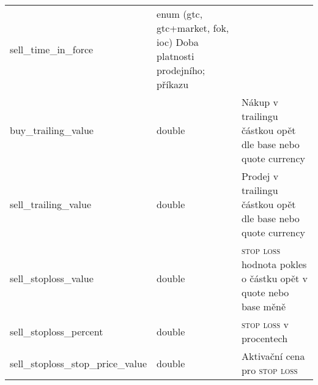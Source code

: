 \begin{center}
\begin{longtable}[t]{|l|C{4cm}|p{4cm}|}
        sell\_time\_in\_force                & enum (gtc, gtc+market, fok, ioc)                                                                                                                                                  Doba platnosti prodejního; příkazu                                                                                                                                     \\
        buy\_trailing\_value                 & double                                                                                                                                                                                                               & Nákup v trailingu částkou opět dle base nebo quote currency                                                                       \\
        sell\_trailing\_value                & double                                                                                                                                                                                                               & Prodej v trailingu částkou opět dle base nebo quote currency                                                                      \\
        sell\_stoploss\_value                & double                                                                                                                                                                                                               & \textsc{stop loss} hodnota pokles o částku opět v quote nebo base měně                                                            \\
        sell\_stoploss\_percent              & double                                                                                                                                                                                                               & \textsc{stop loss} v procentech                                                                                                   \\
        sell\_stoploss\_stop\_price\_value   & double                                                                                                                                                                                                               & Aktivační cena pro  \textsc{stop loss}                                                                                            \\

\end{longtable}
\end{center}
